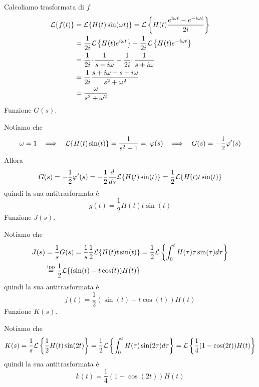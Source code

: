 Calcoliamo trasformata di $f$
\begin{align*}
\mathcal{L}\{f( t)\} & =\mathcal{L}\{H( t)\sin( \omega t)\} =\mathcal{L}\left\{H( t)\frac{e^{i\omega t} -e^{-i\omega t}}{2i}\right\}\\
 & =\frac{1}{2i}\mathcal{L}\left\{H( t) e^{i\omega t}\right\} -\frac{1}{2i}\mathcal{L}\left\{H( t) e^{-i\omega t}\right\}\\
 & =\frac{1}{2i} \cdotp \frac{1}{s-i\omega } -\frac{1}{2i} \cdotp \frac{1}{s+i\omega }\\
 & =\frac{1}{2i}\frac{s+i\omega -s+i\omega }{s^{2} +\omega ^{2}}\\
 & =\frac{\omega }{s^{2} +\omega ^{2}}
\end{align*}
Funzione $G( s)$.

Notiamo che
\begin{equation*}
\omega =1\ \ \implies \ \ \Lc\{H( t)\sin( t)\} =\frac{1}{s^{2} +1} =:\varphi ( s) \ \ \implies \ \ G( s) =-\frac{1}{2} \varphi '( s)
\end{equation*}
Allora
\begin{equation*}
G( s) =-\frac{1}{2} \varphi '( s) =-\frac{1}{2}\frac{d}{ds}\mathcal{L}\{H( t)\sin( t)\} =\frac{1}{2}\mathcal{L}\{H( t) t\sin( t)\}
\end{equation*}
quindi la sua antitrasformata è
\begin{equation*}
g( t) =\frac{1}{2} H( t) t\sin( t)
\end{equation*}
Funzione $J( s)$.

Notiamo che
\begin{align*}
J( s) & =\frac{1}{s} G( s) =\frac{1}{s}\frac{1}{2}\mathcal{L}\{H( t) t\sin( t)\} =\frac{1}{2}\mathcal{L}\left\{\int ^{t}_{0} H( \tau ) \tau \sin( \tau ) d\tau \right\}\\
 & \overset{\text{ipp}}{=}\frac{1}{2}\mathcal{L}\{(\sin( t) -t\cos( t)) H( t)\}
\end{align*}
quindi la sua antitrasformata è
\begin{equation*}
j( t) =\frac{1}{2}(\sin( t) -t\cos( t)) H( t)
\end{equation*}
Funzione $K( s)$.

Notiamo che
\begin{equation*}
K( s) =\frac{1}{s}\mathcal{L}\left\{\frac{1}{2}H( t)\sin( 2t)\right\} =\frac{1}{2}\mathcal{L}\left\{\int ^{t}_{0} H( \tau )\sin( 2\tau ) d\tau \right\} =\mathcal{L}\left\{\frac{1}{4}( 1-\cos( 2t)) H( t)\right\}
\end{equation*}
quindi la sua antitrasformata è
\begin{equation*}
k( t) =\frac{1}{4}( 1-\cos( 2t)) H( t)
\end{equation*}
